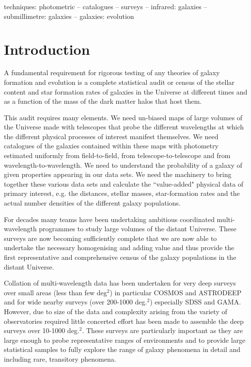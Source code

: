 \documentclass[usenatbib]{mnras}
\begin{document}
\begin{keywords}
  techniques: photometric -- catalogues -- surveys -- infrared: galaxies --
  submillimetre: galaxies -- galaxies: evolution
\end{keywords}
\section{Introduction}\label{sec:intro}


A fundamental requirement for rigorous testing of any theories of galaxy
formation and evolution is a complete statistical audit or census of the stellar
content and star formation rates of galaxies in the Universe at different times
and as a function of the mass of the dark matter halos that host them.

This audit requires many elements.   We need un-biased maps of large volumes of
the Universe made with telescopes that probe the different wavelengths at which
the different physical processes of interest manifest themselves. We need
catalogues of the galaxies contained within these maps with photometry estimated
uniformly from field-to-field, from telescope-to-telescope and from
wavelength-to-wavelength. We need to understand the probability of a galaxy of
given properties appearing in our data sets.  We need the machinery to bring
together these various data sets and calculate the ``value-added" physical data
of primary interest, e.g. the distances, stellar masses,
star-formation rates and the actual number densities of the different galaxy
populations.

For decades many  teams  have been undertaking ambitious coordinated
multi-wavelength programmes to study large volumes of the distant Universe.
These surveys are now becoming sufficiently complete that we are now able to
undertake the necessary homogenising and adding value and thus provide the first
representative and comprehensive census of the galaxy populations in the distant
Universe.

Collation of multi-wavelength data has been undertaken for very deep surveys
over small areas (less than few deg$^2$) in particular COSMOS\citep{cosmos} and ASTRODEEP\citep{astrodeep} and
for wide nearby surveys (over 200-1000 deg.$^2$) especially SDSS\citep{sdss} and GAMA\citep{gama}.
However, due to size of the data and complexity arising from the variety of
observatories required little concerted effort has been made to assemble the
deep surveys over 10-1000 deg.$^2$. These surveys are particularly important as
they are large enough to probe representative  ranges of environments and to
provide large statistical samples to  fully explore the range of galaxy
phenomena in detail and including rare, transitory phenomena.
\end{document}

